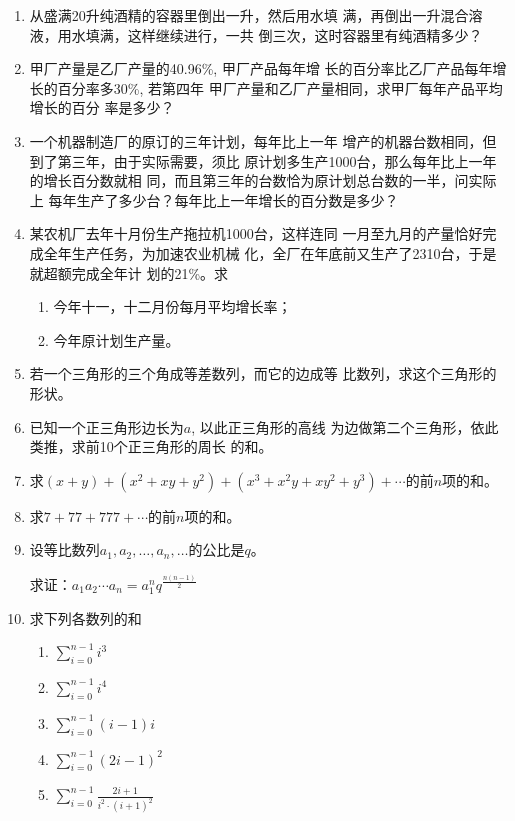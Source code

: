 \begin{enumerate}
\item 从盛满20升纯酒精的容器里倒出一升，然后用水填
满，再倒出一升混合溶液，用水填满，这样继续进行，一共
倒三次，这时容器里有纯酒精多少？
\item 甲厂产量是乙厂产量的40.96\%, 甲厂产品每年增
长的百分率比乙厂产品每年增长的百分率多30\%, 若第四年
甲厂产量和乙厂产量相同，求甲厂每年产品平均增长的百分
率是多少？
\item 一个机器制造厂的原订的三年计划，每年比上一年
增产的机器台数相同，但到了第三年，由于实际需要，须比
原计划多生产1000台，那么每年比上一年的增长百分数就相
同，而且第三年的台数恰为原计划总台数的一半，问实际上
每年生产了多少台？每年比上一年增长的百分数是多少？

\item 某农机厂去年十月份生产拖拉机1000台，这样连同
一月至九月的产量恰好完成全年生产任务，为加速农业机械
化，全厂在年底前又生产了2310台，于是就超额完成全年计
划的21\%。求
\begin{enumerate}
    \item 今年十一，十二月份每月平均增长率；
    \item 今年原计划生产量。
\end{enumerate}

\item 若一个三角形的三个角成等差数列，而它的边成等
比数列，求这个三角形的形状。
\item 已知一个正三角形边长为$a$, 以此正三角形的高线
为边做第二个三角形，依此类推，求前10个正三角形的周长
的和。
\item 求$(x+y)+(x^2+xy+y^2)+(x^3+x^2y+xy^2+y^3)+\cdots$的前$n$项的和。
\item 求$7+77+777+\cdots$的前$n$项的和。

\item 设等比数列$a_1,a_2,\ldots,a_n,\ldots$的公比是$q$。

求证：$a_1a_2\cdots a_n=a^n_1q^{\tfrac{n(n-1)}{2}}$

\item 求下列各数列的和
\begin{multicols}{2}
\begin{enumerate}
    \item $\displaystyle \sum^{n-1}_{i=0} i^3$
    \item $\displaystyle \sum^{n-1}_{i=0} i^4$
    \item $\displaystyle \sum^{n-1}_{i=0} (i-1)i$
    \item $\displaystyle \sum^{n-1}_{i=0} (2i-1)^2$
    \item $\displaystyle \sum^{n-1}_{i=0} \frac{2i+1}{i^2\cdot (i+1)^2}$
\end{enumerate}
\end{multicols}


\end{enumerate}
